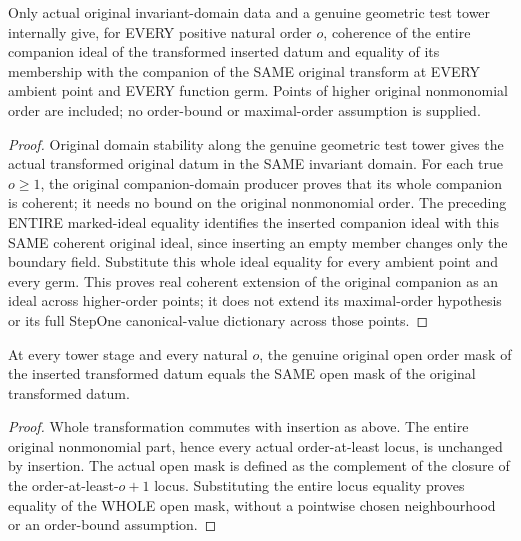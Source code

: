\begin{theorem}
\label{hir:original-positive-companion-empty-whole-coherent}
\leanok
Only actual original invariant-domain data and a genuine geometric test tower internally give, for EVERY positive natural order $o$, coherence of the entire companion ideal of the transformed inserted datum and equality of its membership with the companion of the SAME original transform at EVERY ambient point and EVERY function germ. Points of higher original nonmonomial order are included; no order-bound or maximal-order assumption is supplied.
\end{theorem}
\begin{proof}
Original domain stability along the genuine geometric test tower gives the actual transformed original datum in the SAME invariant domain. For each true $o\ge1$, the original companion-domain producer proves that its whole companion is coherent; it needs no bound on the original nonmonomial order. The preceding ENTIRE marked-ideal equality identifies the inserted companion ideal with this SAME coherent original ideal, since inserting an empty member changes only the boundary field. Substitute this whole ideal equality for every ambient point and every germ. This proves real coherent extension of the original companion as an ideal across higher-order points; it does not extend its maximal-order hypothesis or its full StepOne canonical-value dictionary across those points.
\end{proof}

\begin{lemma}
\label{hir:original-positive-companion-empty-whole-mask}
\leanok
At every tower stage and every natural $o$, the genuine original open order mask of the inserted transformed datum equals the SAME open mask of the original transformed datum.
\end{lemma}
\begin{proof}
Whole transformation commutes with insertion as above. The entire original nonmonomial part, hence every actual order-at-least locus, is unchanged by insertion. The actual open mask is defined as the complement of the closure of the order-at-least-$o+1$ locus. Substituting the entire locus equality proves equality of the WHOLE open mask, without a pointwise chosen neighbourhood or an order-bound assumption.
\end{proof}


